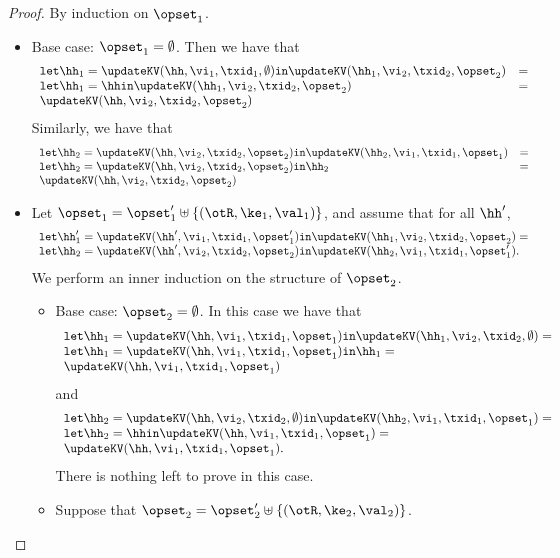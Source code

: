 \begin{proof}
By induction on $\opset_1$. 
\begin{itemize}
\item Base case: $\opset_1 = \emptyset$. Then we have that 
\[
\begin{array}{lr}
\mathtt{let } \hh_1 = \updateKV(\hh, \vi_1, \txid_1, \emptyset) \mathtt{ in } \updateKV(\hh_1, \vi_2, \txid_2, \opset_2) &= \\
\mathtt{let } \hh_1 = \hh \mathtt{ in } \updateKV(\hh_1, \vi_2, \txid_2, \opset_2) &= \\
\updateKV(\hh, \vi_2, \txid_2, \opset_2)
\end{array}
\]
Similarly, we have that 
\[
\begin{array}{lr}
\mathtt{let } \hh_2 = \updateKV(\hh, \vi_2, \txid_2, \opset_2) \mathtt{ in } \updateKV(\hh_2, \vi_1, \txid_1, \opset_1) &=\\
\mathtt{let } \hh_2 = \updateKV(\hh, \vi_2, \txid_2, \opset_2) \mathtt{ in } \hh_2 &=\\
\updateKV(\hh, \vi_2, \txid_2, \opset_2)
\end{array}
\]
\item Let $\opset_1 = \opset_1' \uplus \{(\otR, \ke_1, \val_1)\}$, and assume that for all $\hh'$,
\begin{equation}
\label{eq:updatekv.comm.rd}
\begin{array}{l}
\mathtt{let } \hh_1' = \updateKV(\hh', \vi_1, \txid_1, \opset'_1) \mathtt{ in } \updateKV(\hh_1, \vi_2, \txid_2, \opset_2) = \\
\mathtt{let } \hh_2 = \updateKV(\hh', \vi_2, \txid_2, \opset_2) \mathtt{ in } \updateKV(\hh_2, \vi_1, \txid_1, \opset'_1).
\end{array}
\end{equation}
We perform an inner induction on the structure of $\opset_2$. 
\begin{itemize}
\item Base case: $\opset_2 = \emptyset$. 
In this case we have that 
\[
\begin{array}{l}
\mathtt{let } \hh_1 = \updateKV(\hh, \vi_1, \txid_1, \opset_1) \mathtt{ in } \updateKV(\hh_1, \vi_2, \txid_2, \emptyset) = \\
\mathtt{let } \hh_1 = \updateKV(\hh, \vi_1, \txid_1, \opset_1) \mathtt{ in } \hh_1 = \\
\updateKV(\hh, \vi_1, \txid_1, \opset_1)
\end{array}
\]
and 
\[
\begin{array}{l}
\mathtt{let } \hh_2 = \updateKV(\hh, \vi_2, \txid_2, \emptyset) \mathtt{ in } \updateKV(\hh_2, \vi_1, \txid_1, \opset_1) = \\
\mathtt{let } \hh_2 = \hh \mathtt{ in } \updateKV(\hh, \vi_1, \txid_1, \opset_1) = \\
\updateKV(\hh, \vi_1, \txid_1, \opset_1).
\end{array}
\]
There is nothing left to prove in this case.
\item Suppose that $\opset_2 = \opset_2' \uplus \{(\otR, \ke_2, \val_2)\}$.
\end{itemize}


\end{itemize}
\end{proof}
